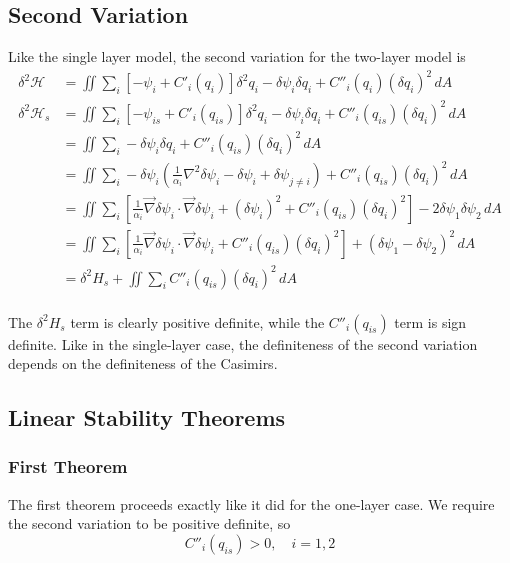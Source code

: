 \documentclass[12pt]{article}
\begin{document}
\subsection{Second Variation}
Like the single layer model, the second variation for the two-layer model is
\begin{align*}
\delta^2 \mathcal{H} &= \iint \sum_i \left[ - \psi_i + C'_i(q_i) \right]  \delta^2 q_i  - \delta \psi_i \delta q_i +  C''_i(q_i) (\delta q_i)^2  \, dA \\
\delta^2 \mathcal{H}_s &= \iint \sum_i \left[ - \psi_{is} + C'_i(q_{is}) \right]  \delta^2 q_i  - \delta \psi_i \delta q_i +  C''_i(q_{is}) (\delta q_i)^2  \, dA \\
 &= \iint \sum_i - \delta \psi_i \delta q_i +  C''_i(q_{is}) (\delta q_i)^2  \, dA \\
 &= \iint \sum_i - \delta \psi_i \left( \frac{1}{\alpha_i} \nabla^2 \delta \psi_i - \delta\psi_i + \delta\psi_{j \ne i} \right) +  C''_i(q_{is}) (\delta q_i)^2  \, dA \\
 &= \iint \sum_i \left[ \frac{1}{\alpha_i} \vec\nabla\delta\psi_i \cdot \vec\nabla\delta\psi_i + (\delta\psi_i)^2 + C''_i(q_{is}) (\delta q_i)^2 \right]  - 2\delta\psi_1\delta\psi_2 \, dA \\
 &= \iint \sum_i \left[ \frac{1}{\alpha_i} \vec\nabla\delta\psi_i \cdot \vec\nabla\delta\psi_i + C''_i(q_{is}) (\delta q_i)^2 \right]+ (\delta\psi_1 - \delta\psi_2)^2 \, dA \\
 &= \delta^2 H_s + \iint \sum_i C''_i(q_{is})(\delta q_i)^2 \, dA \\
\end{align*}

The $\delta^2 H_s$ term is clearly positive definite, while the $C''_i(q_{is})$ term is sign definite. Like in the single-layer case, the definiteness of the second variation depends on the definiteness of the Casimirs.

\subsection{Linear Stability Theorems}
\subsubsection{First Theorem}
The first theorem proceeds exactly like it did for the one-layer case. We require the second variation to be positive definite, so
$$
C''_i(q_{is}) > 0, \quad i=1,2
$$
\end{document}
